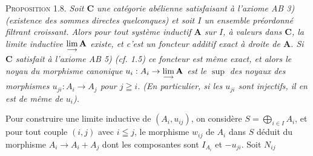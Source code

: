 \textsc{Proposition 1.8.} \textit{Soit $\mathbf{C}$ une catégorie
abélienne satisfaisant à l'axiome \textup{AB 3)} (existence des sommes directes
quelconques) et soit $I$ un ensemble préordonné filtrant croissant. Alors pour
tout système inductif $\mathbf A$ sur $I$, à valeurs dans $\mathbf{C}$, la limite
inductive $\mathop{\rm lim}\limits_{\longrightarrow}\mathbf A$ existe, et
c'est un foncteur additif exact à droite de $\mathbf A$. Si $\mathbf{C}$ satisfait à
l'axiome \textup{AB 5)} \textup{(\textit{cf.} 1.5)} ce foncteur est même exact, et alors le noyau du
morphisme canonique
$u_i:A_i\to\mathop{\rm lim}\limits_{\longrightarrow}\mathbf A$
est le $\sup$ des noyaux des morphismes $u_{ji}:A_i\to A_j$ pour
$j\geqq i$. (En particulier, si les $u_{ji}$ sont injectifs, il en est de même
de $u_i$).}

Pour construire une limite inductive de $(A_i,u_{ij})$, on considère $S=\displaystyle\bigoplus_{i\in I}A_i$, et pour tout couple $(i,j)$ avec $i\leqq j$, le morphisme $w_{ij}$ de
$A_i$ dans $S$ déduit du morphisme $A_i\to A_i+A_j$ dont les
composantes sont $I_{A_i}$ et $-u_{ji}$. Soit $N_{ij}$

